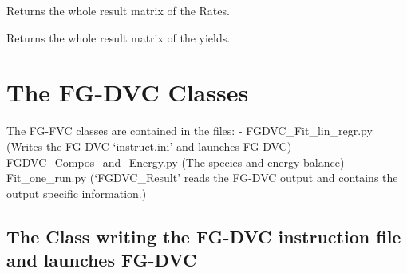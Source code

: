\documentclass[letterpaper,10pt,english]{sphinxmanual}
\begin{document}
\begin{fulllineitems}
\begin{fulllineitems}
\label{CPDClasses:Fit_one_run.CPD_Result.Rates_all}
Returns the whole result matrix of the Rates.

\end{fulllineitems}


\begin{fulllineitems}
\label{CPDClasses:Fit_one_run.CPD_Result.Yields_all}
Returns the whole result matrix of the yields.

\end{fulllineitems}


\end{fulllineitems}



\chapter{The FG-DVC Classes}
\label{FGDVCClasses:the-fg-dvc-classes}\label{FGDVCClasses::doc}
The FG-FVC classes are contained in the files:
- FGDVC\_Fit\_lin\_regr.py  (Writes the FG-DVC `instruct.ini' and launches FG-DVC)
- FGDVC\_Compos\_and\_Energy.py  (The species and energy balance)
- Fit\_one\_run.py  (`FGDVC\_Result' reads the FG-DVC output and contains the output specific information.)
\label{FGDVCClasses:ss-readgen}

\section{The Class writing the FG-DVC instruction file and launches FG-DVC}
\label{FGDVCClasses:ss-readgen}\label{FGDVCClasses:the-class-writing-the-fg-dvc-instruction-file-and-launches-fg-dvc}\label{FGDVCClasses:my-reference-label}
\end{document}
